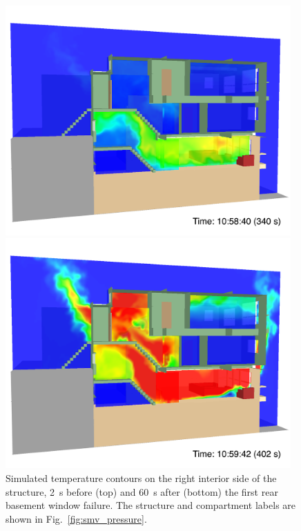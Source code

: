 \documentclass[12pt,oneside]{book}
\begin{document}
\begin{figure}[!ht]
\includegraphics[width=4.3in]{../Figures/SMV_Temp_340_s}


\includegraphics[width=4.3in]{../Figures/SMV_Temp_402_s}


\caption[Simulated temperature contours on the right interior side of the structure.]
{Simulated temperature contours on the right interior side of the structure, 2~s before (top) and 60~s after (bottom) the first rear basement window failure. The structure and compartment labels are shown in Fig.~\ref{fig:smv_pressure}.}
\label{fig:smv_temperature}
\end{figure}


\clearpage
\end{document}
